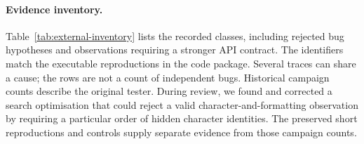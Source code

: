 \paragraph{Evidence inventory.}
Table~\ref{tab:external-inventory} lists the recorded classes, including
rejected bug hypotheses and observations requiring a stronger API contract.
The identifiers match the executable reproductions in the code package.
Several traces can share a cause; the rows are not a count of independent
bugs. Historical campaign counts describe the original tester. During
review, we found and corrected a search optimisation that could reject a
valid character-and-formatting observation by requiring a particular order
of hidden character identities. The preserved short reproductions and
controls supply separate evidence from those campaign counts.

